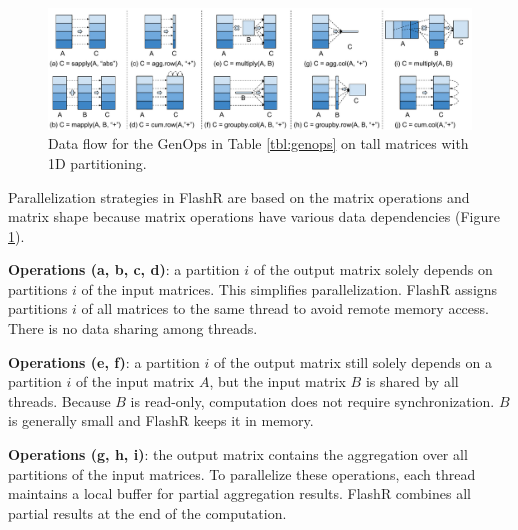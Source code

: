 \begin{figure}
	\centering
	\includegraphics[scale=0.5]{FlashMatrix_figs/Parallelize.pdf}
	\vspace{-4pt}
	\caption{Data flow for the GenOps in Table \ref{tbl:genops} on tall matrices
	 with 1D partitioning.}
	\label{fig:parallel}
  \vspace{-8pt}
\end{figure}

Parallelization strategies in FlashR are based on the matrix operations
and matrix shape because matrix operations have various data dependencies
(Figure \ref{fig:parallel}).

\noindent \textbf{Operations (a, b, c, d)}: a partition $i$ of the output matrix solely depends
		on partitions $i$ of the input matrices. This simplifies
		parallelization. FlashR assigns partitions $i$ of all matrices to
		the same thread to avoid remote memory access. There is no data sharing
		among threads.

\noindent \textbf{Operations (e, f)}: a partition
		$i$ of the output matrix still solely depends on a partition
		$i$ of the input matrix $A$, but the input matrix
		$B$ is shared by all threads. Because $B$ is
		read-only, computation does not require synchronization.
		$B$ is generally small and FlashR keeps it in memory.

\noindent \textbf{Operations (g, h, i)}: the output matrix contains the aggregation
		over all partitions of the input matrices. To parallelize these operations,
		each thread maintains a local buffer for partial aggregation results.
		FlashR combines all partial results at the end of
		the computation.


